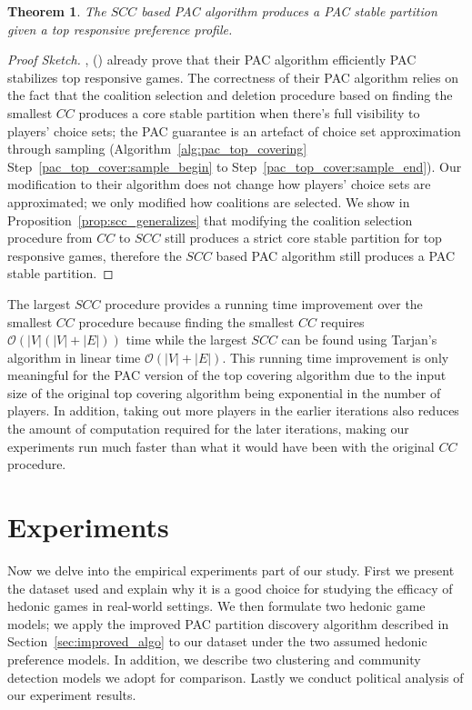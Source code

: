 \documentclass[letterpaper]{article} %
\newcommand{\citename}[1]{\citeauthor{#1}, (\citeyear{#1})}
\newcommand{\CC}{\mathit{CC}}
\newcommand{\SCC}{\mathit{SCC}}
\newtheorem{theorem}{Theorem}[section]
\theoremstyle{definition}
\begin{document}
\begin{theorem}
  The $\SCC$ based PAC algorithm produces a PAC stable partition given a top responsive preference profile.
\end{theorem}

\begin{proof}[Proof Sketch]
\citename{ijcai2017-380} already prove that their PAC algorithm efficiently PAC stabilizes top responsive games. 
The correctness of their PAC algorithm relies on the fact that the coalition selection and deletion procedure based on finding the smallest $\CC$ produces a core stable partition when there's full visibility to players' choice sets; the PAC guarantee is an artefact of choice set approximation through sampling (Algorithm~\ref{alg:pac_top_covering} Step~\ref{pac_top_cover:sample_begin} to Step~\ref{pac_top_cover:sample_end}). 
Our modification to their algorithm does not change how players' choice sets are approximated; we only modified how coalitions are selected. 
We show in Proposition~\ref{prop:scc_generalizes} that modifying the coalition selection procedure from $\CC$ to $\SCC$ still produces a strict core stable partition for top responsive games, therefore the $\SCC$ based PAC algorithm still produces a PAC stable partition.
\end{proof}

The largest $\SCC$ procedure provides a running time improvement over the smallest $\CC$ procedure because finding the smallest $\CC$ requires $\mathcal{O}(|V|(|V| + |E|))$ time while the largest $\SCC$ can be found using Tarjan's algorithm in linear time $\mathcal{O}(|V| + |E|)$\cite{Tarjan72depthfirst}. 
This running time improvement is only meaningful for the PAC version of the top covering algorithm due to the input size of the original top covering algorithm being exponential in the number of players. 
In addition, taking out more players in the earlier iterations also reduces the amount of computation required for the later iterations, making our experiments run much faster than what it would have been with the original $\CC$ procedure.

\section{Experiments} \label{sec:experiment}
Now we delve into the empirical experiments part of our study. First we present the dataset used and explain why it is a good choice for studying the efficacy of hedonic games in real-world settings. We then formulate two hedonic game models; we apply the improved PAC partition discovery algorithm described in Section~\ref{sec:improved_algo} to our dataset under the two assumed hedonic preference models. In addition, we describe two clustering and community detection models we adopt for comparison. Lastly we conduct political analysis of our experiment results.
\end{document}
